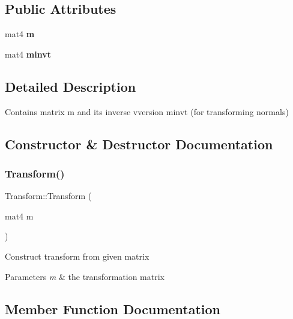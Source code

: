 \subsection*{Public Attributes}
\begin{DoxyCompactItemize}
\item 
\mbox{\label{class_transform_ac7c371bdd14ff1c6434cac58082eff10}} 
mat4 {\bfseries m}
\item 
\mbox{\label{class_transform_a57f1d2c66d7715757bbd79c61774dd87}} 
mat4 {\bfseries minvt}
\end{DoxyCompactItemize}


\subsection{Detailed Description}
Contains matrix \textquotesingle{}m\textquotesingle{} and its inverse vversion \textquotesingle{}minvt\textquotesingle{} (for transforming normals) 

\subsection{Constructor \& Destructor Documentation}
\mbox{\label{class_transform_a9e66877ba4b108deb475d91b3e484b19}} 
\subsubsection{\texorpdfstring{Transform()}{Transform()}}
{\footnotesize\ttfamily Transform\+::\+Transform (\begin{DoxyParamCaption}\item[{mat4}]{m }\end{DoxyParamCaption})\hspace{0.3cm}{\ttfamily [inline]}}

Construct transform from given matrix 
\begin{DoxyParams}{Parameters}
{\em m} & the transformation matrix \\
\hline
\end{DoxyParams}


\subsection{Member Function Documentation}
\mbox{\label{class_transform_a846e6b2bec58a1110d4e5296b1caa1f4}} 
